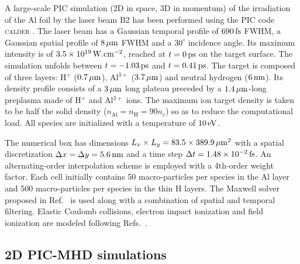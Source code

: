 \documentclass[aps,twocolumn,showpacs,superscriptaddress]{revtex4}
\begin{document}
A large-scale PIC simulation (2D in space, 3D in momentum) of the irradiation of the Al foil by the laser beam B2 has been performed using the PIC code \textsc{calder} \cite{NF_Lefebvre_2003}. The laser beam has a Gaussian temporal profile of $690\,\rm fs$ FWHM, a Gaussian spatial profile of $8\,\rm \mu m$ FWHM and a $30^\circ$ incidence angle. Its maximum intensity is of $3.5 \times 10^{19}\,\rm W.cm^{-2}$, reached at $t=0\,\rm ps$ on the target surface. The simulation unfolds between $t = -1.03\,\rm ps$ and $t = 0.41\,\rm ps$. The target is composed of three layers: H$^+$ ($0.7\,\rm \mu m$), Al$^{3+}$ ($3.7\,\rm \mu m$) and neutral hydrogen ($6\,\rm nm$). Its density profile consists of a $3\,\rm \mu m$ long plateau preceded by a $1.4\,\rm \mu m$-long preplasma made of H$^+$ and Al$^{3+}$ ions. The maximum ion target density is taken to be half the solid density ($n_\mathrm{Al}=n_\mathrm{H}=90 n_c$) so as to reduce the computational load. All species are initialized with a temperature of $10\,\rm eV$.

The numerical box has dimensions $L_x \times L_y = 83.5 \times 389.9\,\rm \mu m^2$ with a spatial discretization $\Delta x = \Delta y = 5.6\,\rm nm$ and a time step $\Delta t = 1.48\times 10^{-2}\,\rm fs$. An alternating-order interpolation scheme \cite{CPC_Sokolov_2013} is employed with a 4th-order weight factor. Each cell initially contains 50 macro-particles per species in the Al layer and 500 macro-particles per species in the thin H layers. The Maxwell solver proposed in Ref.~\cite{PRSTAB_Lehe_2013} is used along with a combination of spatial \cite{JCP_Vay_2011} and temporal \cite{JCP_Friedman_1990} filtering. Elastic Coulomb collisions, electron impact ionization and field ionization are modeled following Refs.~\cite{POP_Perez_2012}.

\subsection*{2D PIC-MHD simulations}
\end{document}
